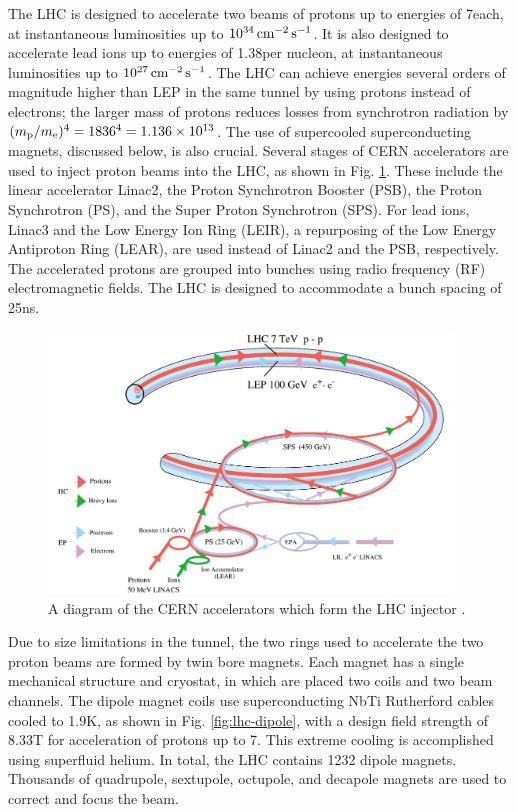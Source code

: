 The LHC is designed to accelerate two beams of protons up to energies of 7\TeV each, at instantaneous luminosities up to $10^{34}\,\text{cm}^\text{$-$2}\,\text{s}^\text{$-$1}$. It is also designed to accelerate lead ions up to energies of 1.38\TeV per nucleon, at instantaneous luminosities up to $10^{27}\,\text{cm}^\text{$-$2}\,\text{s}^\text{$-$1}$. The LHC can achieve energies several orders of magnitude higher than LEP in the same tunnel by using protons instead of electrons; the larger mass of protons reduces losses from synchrotron radiation by $(m_{\mathrm{p}}/m_{\mathrm{e}})^{4} = 1836^{4} = 1.136\times10^{13}$. The use of supercooled superconducting magnets, discussed below, is also crucial. Several stages of CERN accelerators are used to inject proton beams into the LHC, as shown in Fig. \ref{fig:lhc-injectors}. These include the linear accelerator Linac2, the Proton Synchrotron Booster (PSB), the Proton Synchrotron (PS), and the Super Proton Synchrotron (SPS). For lead ions, Linac3 and the Low Energy Ion Ring (LEIR), a repurposing of the Low Energy Antiproton Ring (LEAR), are used instead of Linac2 and the PSB, respectively. The accelerated protons are grouped into bunches using radio frequency (RF) electromagnetic fields. The LHC is designed to accommodate a bunch spacing of 25\unit{ns}.

\begin{figure}[hbt]
\begin{center}
\includegraphics[width=0.95\textwidth]{figures/lhc-pho-1993-008.png}
\caption{A diagram of the CERN accelerators which form the LHC injector \cite{Jean-Luc:841568}.}
\label{fig:lhc-injectors}
\end{center}
\end{figure}

Due to size limitations in the tunnel, the two rings used to accelerate the two proton beams are formed by twin bore magnets. Each magnet has a single mechanical structure and cryostat, in which are placed two coils and two beam channels. The dipole magnet coils use superconducting NbTi Rutherford cables cooled to 1.9\unit{K}, as shown in Fig. \ref{fig:lhc-dipole}, with a design field strength of 8.33\unit{T} for acceleration of protons up to 7\TeV. This extreme cooling is accomplished using superfluid helium. In total, the LHC contains 1232 dipole magnets. Thousands of quadrupole, sextupole, octupole, and decapole magnets are used to correct and focus the beam.

